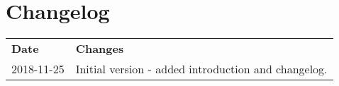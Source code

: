 \chapter*{Changelog}

\begin{tabular}{ll}
 \textbf{Date} & \textbf{Changes}\\
 2018-11-25 & Initial version - added introduction and changelog. \\
\end{tabular}
